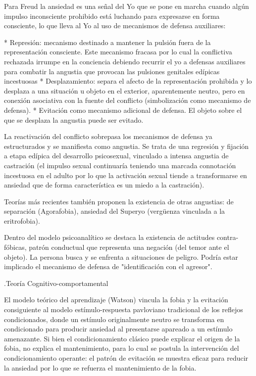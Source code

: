 \begin{itemize}
Para Freud la ansiedad es una señal del Yo que se pone en marcha cuando algún impulso inconsciente prohibido está luchando para expresarse en forma consciente, lo que lleva al Yo al uso de mecanismos de defensa auxiliares:

* Represión: mecanismo destinado a mantener la pulsión fuera de la representación consciente. Este mecanismo fracasa por lo cual la conflictiva rechazada irrumpe en la conciencia debiendo recurrir el yo a defensas auxiliares para combatir la angustia que provocan las pulsiones genitales edípicas incestuosas
* Desplazamiento: separa el afecto de la representación prohibida y lo desplaza a una situación u objeto en el exterior, aparentemente neutro, pero en conexión asociativa con la fuente del conflicto (simbolización como mecanismo de defensa).
* Evitación como mecanismo adicional de defensa. El objeto sobre el que se desplaza la angustia puede ser evitado.

La reactivación del conflicto sobrepasa los mecanismos de defensa ya estructurados y se manifiesta como angustia. Se trata de una regresión y fijación a etapa edípica del desarrollo psicosexual, vinculado a intensa angustia de castración (el impulso sexual continuaría teniendo una marcada connotación incestuosa en el adulto por lo que la activación sexual tiende a transformarse en ansiedad que de forma característica es un miedo a la castración).

Teorías más recientes también proponen la existencia de otras angustias: de separación (Agorafobia), ansiedad del Superyo (vergüenza vinculada a la eritrofobia).

Dentro del modelo psicoanalítico se destaca la existencia de actitudes contra-fóbicas, patrón conductual que representa una negación (del temor ante el objeto). La persona busca y se enfrenta a situaciones de peligro. Podría estar implicado el mecanismo de defensa de "identificación con el agresor".

.Teoría Cognitivo-comportamental

El modelo teórico del aprendizaje (Watson) vincula la fobia y la evitación consiguiente al modelo estímulo-respuesta pavloviano tradicional de los reflejos condicionados, donde un estímulo originalmente neutro se transforma en condicionado para producir ansiedad al presentarse apareado a un estímulo amenazante. Si bien el condicionamiento clásico puede explicar el origen de la fobia, no explica el mantenimiento, para lo cual se postula la intervención del condicionamiento operante: el patrón de evitación se muestra eficaz para reducir la ansiedad por lo que se refuerza el mantenimiento de la fobia.


\end{itemize}
